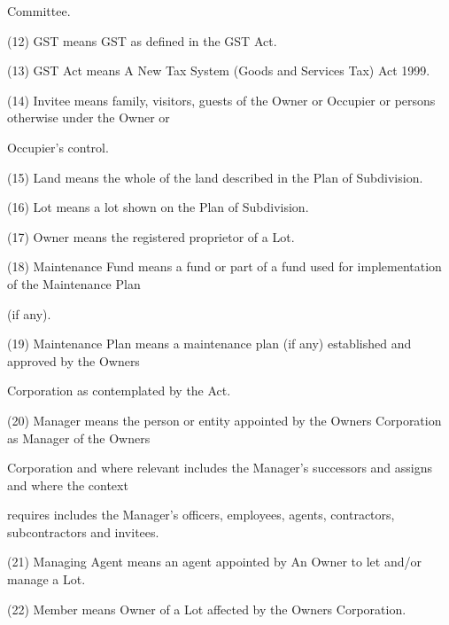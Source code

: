 \documentclass{article}
\begin{document}
{\fontsize{10.02}{1}Committee. }

{\fontsize{9.962}{1}(12) GST means GST as defined in the GST Act. }

{\fontsize{9.962}{1}(13) GST Act means A New Tax System (Goods and Services Tax) Act 1999. }

{\fontsize{9.962}{1}(14) Invitee means family, visitors, guests of the Owner or Occupier or persons otherwise under the Owner or }

{\fontsize{10.02}{1}Occupier’s control. }

{\fontsize{9.962}{1}(15) Land means the whole of the land described in the Plan of Subdivision. }

{\fontsize{9.962}{1}(16) Lot means a lot shown on the Plan of Subdivision. }

{\fontsize{9.962}{1}(17) Owner means the registered proprietor of a Lot. }

{\fontsize{9.962}{1}(18) Maintenance Fund means a fund or part of a fund used for implementation of the Maintenance Plan }

{\fontsize{10.02}{1}(if any).  }

{\fontsize{9.962}{1}(19) Maintenance Plan means a maintenance plan (if any) established and approved by the Owners }

{\fontsize{10.02}{1}Corporation as contemplated by the Act.  }

{\fontsize{9.962}{1}(20) Manager means the person or entity appointed by the Owners Corporation as Manager of the Owners }

{\fontsize{10.02}{1}Corporation and where relevant includes the Manager’s successors and assigns and where the context }

{\fontsize{10.02}{1}requires includes the Manager’s officers, employees, agents, contractors, subcontractors and invitees. }

{\fontsize{9.962}{1}(21) Managing Agent means an agent appointed by An Owner to let and/or manage a Lot. }

\newpage


















{\fontsize{9.962}{1}(22) Member means Owner of a Lot affected by the Owners Corporation. }
\end{document}
